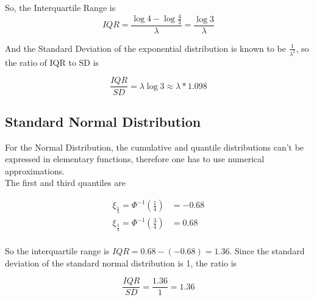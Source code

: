 \documentclass[paper=a4, fontsize=11pt]{scrartcl} %
\numberwithin{equation}{section} %
\numberwithin{figure}{section} %
\numberwithin{table}{section} %
\begin{document}
So, the Interquartile Range is
\begin{equation}
	IQR = \frac{\log{4} - \log{\frac{4}{3}}}{\lambda} = \frac{\log{3}}{\lambda}
\end{equation}

And the Standard Deviation of the exponential distribution is known to be $\frac{1}{\lambda^2}$, so the ratio of IQR to SD is

\begin{equation}
	\frac{IQR}{SD} = \lambda \log{3} \approx \lambda * 1.098
\end{equation}


\subsection{Standard Normal Distribution}
For the Normal Distribution, the cumulative and quantile distributions can't be expressed in elementary functions, therefore one has to use numerical approximations.\\
The first and third quantiles are

\begin{equation}
\begin{aligned} 
	\xi_{\frac{1}{4}} = \Phi^{-1}(\tfrac{1}{4}) &= -0.68 \\
	\xi_{\frac{3}{4}} = \Phi^{-1}(\tfrac{3}{4}) &= 0.68
\end{aligned}
\end{equation}
\\
So the interquartile range is $IQR = 0.68-(-0.68) = 1.36$. Since the standard deviation of the standard normal distribution is 1, the ratio is

\begin{equation}
	\frac{IQR}{SD} = \frac{1.36}{1} = 1.36
\end{equation}
\end{document}
